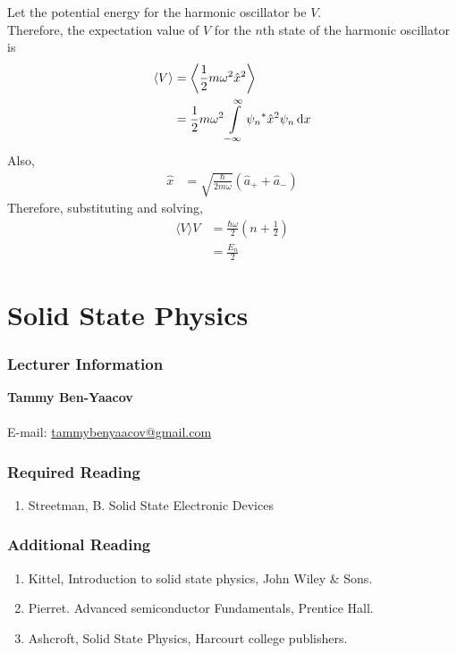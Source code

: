\documentclass[titlepage, fleqn, a4paper, 12pt, twoside]{article}
\theoremstyle{definition}
\theoremstyle{theorem}
\begin{document}
Let the potential energy for the harmonic oscillator be $V$.\\
Therefore, the expectation value of $V$ for the $n$th state of the harmonic oscillator is
\begin{align*}
	\langle V \rangle &= \left\langle \frac{1}{2} m \omega^2 \hat{x}^2 \right\rangle\\
	&= \frac{1}{2} m \omega^2 \int\limits_{-\infty}^{\infty} {\psi_n}^* \hat{x}^2 \psi_n \dif x
\end{align*}
Also,
\begin{align*}
	\hat{x} &= \sqrt{\frac{\hbar}{2 m \omega}} \left( \hat{a}_+ + \hat{a}_- \right)
\end{align*}
Therefore, substituting and solving,
\begin{align*}
	\langle V \rangle V &= \frac{\hbar \omega}{2} \left( n + \frac{1}{2} \right)\\
	&= \frac{E_n}{2}
\end{align*}

\newpage
\part{Solid State Physics}

\section{Lecturer Information}

\textbf{Tammy Ben-Yaacov}\\
~\\
E-mail: \href{mailto:tammybenyaacov@gmail.com}{tammybenyaacov@gmail.com}\\

\section{Required Reading}

\begin{enumerate}
	\item Streetman, B. Solid State Electronic Devices
\end{enumerate}

\section{Additional Reading}

\begin{enumerate}
	\item Kittel, Introduction to solid state physics, John Wiley \& Sons.
	\item Pierret. Advanced semiconductor Fundamentals, Prentice Hall.
	\item Ashcroft, Solid State Physics, Harcourt college publishers.
\end{enumerate}
\end{document}
